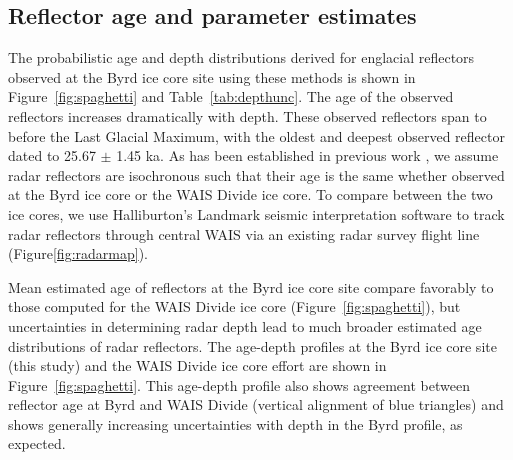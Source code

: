 
\subsection{Reflector age and parameter estimates}
The probabilistic age and depth distributions derived for englacial reflectors observed at the Byrd ice core site using these methods is shown in Figure~\ref{fig:spaghetti} and Table~\ref{tab:depthunc}. The age of the observed reflectors increases dramatically with depth.  These observed reflectors span to before the Last Glacial Maximum, with the oldest and deepest observed reflector dated to 25.67 $\pm$ 1.45 ka. As has been established in previous work \citep{siegert1998,dowdeswellevans2004}, we assume radar reflectors are isochronous such that their age is the same whether observed at the Byrd ice core or the WAIS Divide ice core. To compare between the two ice cores, we use Halliburton's Landmark seismic interpretation software to track radar reflectors through central WAIS via an existing radar survey flight line (Figure\ref{fig:radarmap}).%

Mean estimated age of reflectors at the Byrd ice core site compare favorably to those computed for the WAIS Divide ice core (Figure~\ref{fig:spaghetti}), but uncertainties in determining radar depth lead to much broader estimated age distributions of radar reflectors. The age-depth profiles at the Byrd ice core site (this study) and the WAIS Divide ice core effort are shown in Figure~\ref{fig:spaghetti}. This age-depth profile also shows agreement between reflector age at Byrd and WAIS Divide (vertical alignment of blue triangles) and shows generally increasing uncertainties with depth in the Byrd profile, as expected. 

